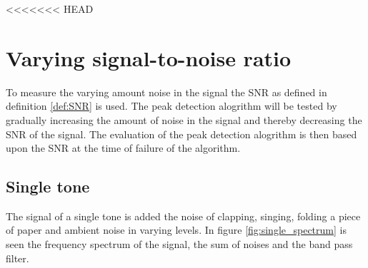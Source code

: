 <<<<<<< HEAD
\section{Varying signal-to-noise ratio}
To measure the varying amount noise in the signal the SNR as defined in definition \ref{def:SNR} is used. The peak detection alogrithm will be tested by gradually increasing the amount of noise in the signal and thereby decreasing the SNR of the signal. The evaluation of the peak detection alogrithm is then based upon the SNR at the time of failure of the algorithm.
\subsection{Single tone}
The signal of a single tone is added the noise of clapping, singing, folding a piece of paper and ambient noise in varying levels. In figure \ref{fig:single_spectrum} is seen the frequency spectrum of the signal, the sum of noises and the band pass filter.
